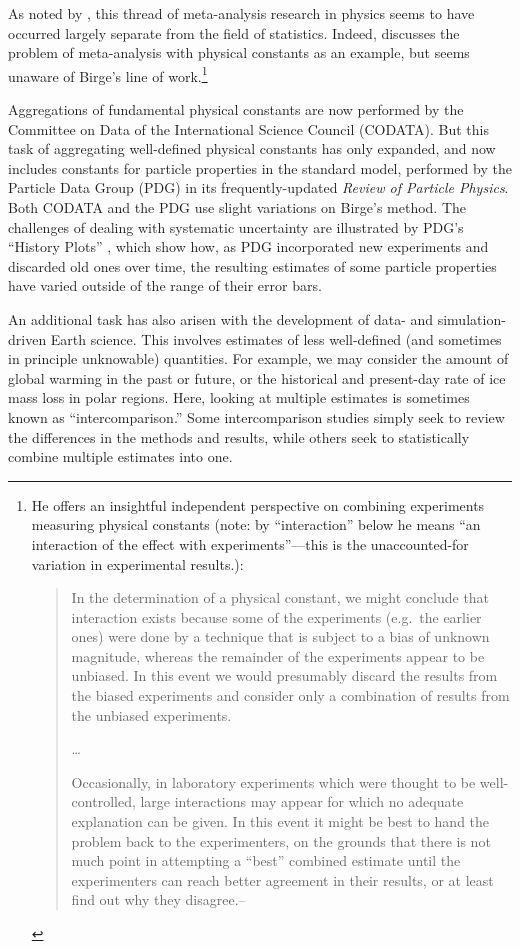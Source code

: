 \documentclass[letterpaper,12pt]{article}
\begin{document}
As noted by \citet{baker2013meta}, this thread of meta-analysis research in physics seems to have occurred largely separate from the field of statistics. Indeed, \citet{cochran1954combination} discusses the problem of meta-analysis with physical constants as an example, but seems unaware of Birge's line of work.\footnote{
He offers an insightful independent perspective on combining experiments measuring physical constants (note: by ``interaction'' below he means ``an interaction of the effect with experiments''---this is the unaccounted-for variation in experimental results.):
\begin{quote}
  In the determination of a physical constant, we might conclude that interaction exists because some of the experiments (e.g.~the earlier ones) were done by a technique that is subject to a bias of unknown magnitude, whereas the remainder of the experiments appear to be unbiased. In this event we would presumably discard the results from the biased experiments and consider only a combination of results from the unbiased experiments.

  \ldots

  Occasionally, in laboratory experiments which were thought to be well-controlled, large interactions may appear for which no adequate explanation can be given. In this event it might be best to hand the problem back to the experimenters, on the grounds that there is not much point in attempting a ``best'' combined estimate until the experimenters can reach better agreement in their results, or at least find out why they disagree.\hfill --\citet{cochran1954combination}
\end{quote}
}

Aggregations of fundamental physical constants are now performed by the Committee on Data of the International Science Council (CODATA). But this task of aggregating well-defined physical constants has only expanded, and now includes constants for particle properties in the standard model, performed by the Particle Data Group (PDG) in its frequently-updated \textit{Review of Particle Physics}. Both CODATA and the PDG use slight variations on Birge's method. The challenges of dealing with systematic uncertainty are illustrated by PDG's ``History Plots'' \citep[pg. 19, Figure 1]{navas2024review}, which show how, as PDG incorporated new experiments and discarded old ones over time, the resulting estimates of some particle properties have varied outside of the range of their error bars.

An additional task has also arisen with the development of data- and simulation-driven Earth science. This involves estimates of less well-defined (and sometimes in principle unknowable) quantities. For example, we may consider the amount of global warming in the past or future, or the historical and present-day rate of ice mass loss in polar regions. Here, looking at multiple estimates is sometimes known as ``intercomparison.'' Some intercomparison studies simply seek to review the differences in the methods and results, while others seek to statistically combine multiple estimates into one.
\end{document}
